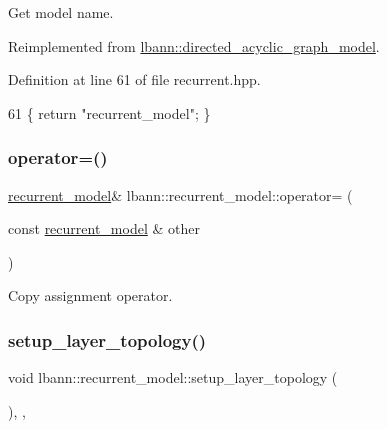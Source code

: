 Get model name. 

Reimplemented from \hyperlink{classlbann_1_1directed__acyclic__graph__model_ad2b97ab2670e76538a754e28e19b5c94}{lbann\+::directed\+\_\+acyclic\+\_\+graph\+\_\+model}.



Definition at line 61 of file recurrent.\+hpp.


\begin{DoxyCode}
61 \{ \textcolor{keywordflow}{return} \textcolor{stringliteral}{"recurrent\_model"}; \}
\end{DoxyCode}
\mbox{\label{classlbann_1_1recurrent__model_a32882b23c459e1ce577fc97414521315}} 
\subsubsection{\texorpdfstring{operator=()}{operator=()}}
{\footnotesize\ttfamily \hyperlink{classlbann_1_1recurrent__model}{recurrent\+\_\+model}\& lbann\+::recurrent\+\_\+model\+::operator= (\begin{DoxyParamCaption}\item[{const \hyperlink{classlbann_1_1recurrent__model}{recurrent\+\_\+model} \&}]{other }\end{DoxyParamCaption})\hspace{0.3cm}{\ttfamily [default]}}

Copy assignment operator. \mbox{\label{classlbann_1_1recurrent__model_ac89ddfa607e5cb6b940eb389ebbce6f6}} 
\subsubsection{\texorpdfstring{setup\+\_\+layer\+\_\+topology()}{setup\_layer\_topology()}}
{\footnotesize\ttfamily void lbann\+::recurrent\+\_\+model\+::setup\+\_\+layer\+\_\+topology (\begin{DoxyParamCaption}{ }\end{DoxyParamCaption})\hspace{0.3cm}{\ttfamily [override]}, {\ttfamily [protected]}, {\ttfamily [virtual]}}

